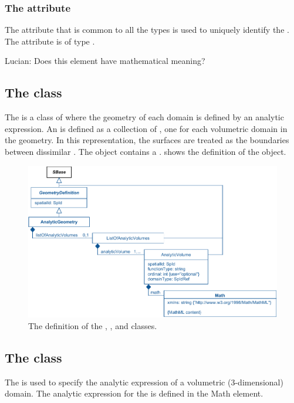 \subsubsection{The  attribute}
The  attribute that is common to all the \GeometryDefinition types is used to uniquely identify the \GeometryDefinition. The attribute is of type .

{\color{red} Lucian: \notice Does this element have mathematical meaning?}


\subsection{The  class}
\label{AnalyticGeometry-class}
\label{ListOfAnalyticVolumes-class}
The \AnalyticGeometry is a class of \GeometryDefinition where the geometry of each domain is defined by an analytic expression. An \AnalyticGeometry is defined as a collection of \AnalyticVolumes, one \AnalyticVolume for each volumetric domain in the geometry. In this representation, the surfaces are treated as the boundaries between dissimilar \AnalyticVolumes. The \AnalyticGeometry object contains a \ListOfAnalyticVolumes.  shows the definition of the \AnalyticGeometry object.

\begin{figure}[ht]
  \includegraphics{figs/AnalyticGeometry-uml}
  \caption{The definition of the \AnalyticGeometry, \ListOfAnalyticVolumes, and \AnalyticVolume classes.}
  \label{AnalyticGeometry-uml}
  \label{ListOfAnalyticVolumes-uml}
  \label{AnalyticVolume-uml}
\end{figure}


\subsection{The  class}
\label{AnalyticVolume-class}
The \AnalyticVolume is used to specify the analytic expression of a volumetric (3-dimensional) domain. The analytic expression for the \AnalyticVolume is defined in the Math element.

